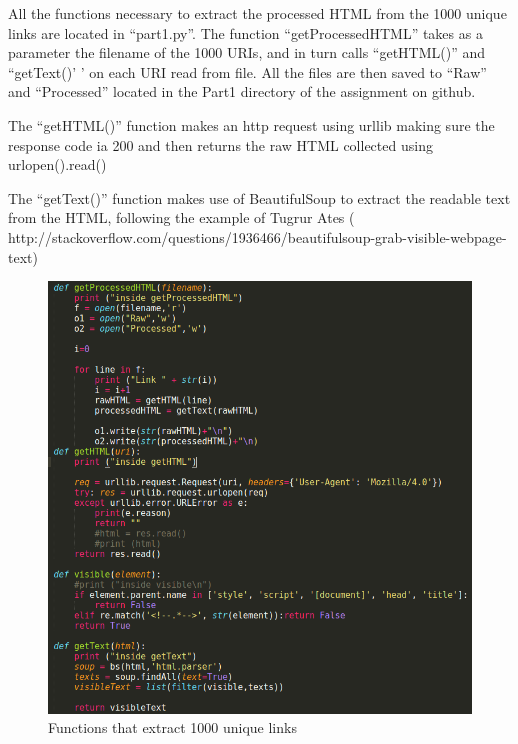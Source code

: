 \documentclass{article}
\begin{document}
\large{
All the functions necessary to extract the processed HTML from the 1000 unique links are located in ``part1.py''.  The function ``getProcessedHTML'' takes as a parameter the filename of the 1000 URIs, and in turn calls ``getHTML()'' and ``getText()' ' on each URI read from file. All the files are then saved to ``Raw'' and ``Processed''  located in the Part1 directory of the assignment on github.\\

\par The ``getHTML()''  function makes an http request using urllib making sure the response code ia 200 and then returns the raw HTML collected using urlopen().read()\\

\par  The ``getText()''  function makes use of BeautifulSoup to extract the readable text from the HTML, following the example of Tugrur Ates ( http://stackoverflow.com/questions/1936466/beautifulsoup-grab-visible-webpage-text) 

\begin{figure}[H]
 \centering
 	\includegraphics[height=15 cm]{part1.png}
  \caption{Functions that extract 1000 unique links}
\end{figure}


}
\end{document}
